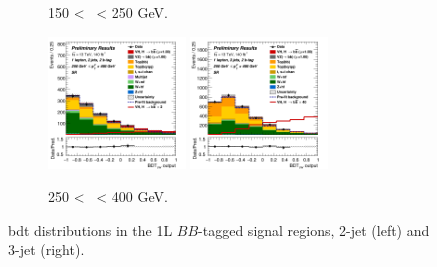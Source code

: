 \begin{figure}[h!]
\begin{subfigure}[b]{\textwidth}
        \caption{150 < \ptv\ < 250 GeV.}
        \label{fig:plots_VHbb_1L_150_SR}
    \end{subfigure}
    \begin{subfigure}[b]{\textwidth}
        \centering
        \includegraphics[width=0.40\textwidth]{Images/VH/Own_fit/postfit_VHbb/Region_distmva_BMax400_BMin250_DSR_J2_TTypebb_T2_L1_Y6051_GlobalFit_conditionnal_mu1.png}
        \includegraphics[width=0.40\textwidth]{Images/VH/Own_fit/postfit_VHbb/Region_distmva_BMax400_BMin250_DSR_J3_TTypebb_T2_L1_Y6051_GlobalFit_conditionnal_mu1.png}
        \caption{250 < \ptv\ < 400 GeV.}
        \label{fig:plots_VHbb_1L_250_SR}
    \end{subfigure}
    \caption{\gls{bdt} distributions in the 1L $BB$-tagged signal regions, 2-jet (left) and 3-jet (right).}
    \label{fig:plots_VHbb_1L_SR}
\end{figure} 

\vspace*{\fill} \clearpage
\vspace*{\fill}


